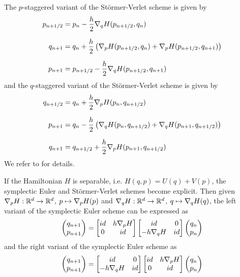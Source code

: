 \documentclass[twoside,a4paper]{article}
\begin{document}
The $p$-staggered variant of the Störmer-Verlet scheme is given by
\begin{align*}
	p_{n+1/2} &= p_n - \frac{h}{2} \grad[q]{H}(p_{n+1/2}, q_n) \\[7pt]
	q_{n+1} &= q_n + \frac{h}{2} \lb \grad[p]{H}(p_{n+1/2}, q_n) + \grad[p]{H}(p_{n+1/2}, q_{n+1}) \rb \\[7pt]
	p_{n+1} &= p_{n+1/2} - \frac{h}{2} \grad[q]{H}(p_{n+1/2}, q_{n+1})
\end{align*}
and the $q$-staggered variant of the Störmer-Verlet scheme is given by
\begin{align*}
	q_{n+1/2} &= q_n + \frac{h}{2} \grad[p]{H}(p_n, q_{n+1/2}) \\[7pt]
	p_{n+1} &= q_n - \frac{h}{2} \lb \grad[q]{H}(p_n, q_{n+1/2}) + \grad[q]{H}(p_{n+1}, q_{n+1/2}) \rb \\[7pt]
	q_{n+1} &= q_{n+1/2} + \frac{h}{2} \grad[p]{H}(p_{n+1}, q_{n+1/2})
\end{align*}
We refer to \citet[p.~189 and p.~190]{hairer2006} for details.

If the Hamiltonian $H$ is separable, i.e. $H(q,p) = U(q) + V(p)$, the symplectic Euler and Störmer-Verlet
schemes become explicit. Then given $\grad[p]{H} : \mathbb{R}^d \to \mathbb{R}^d$, $p \mapsto \grad[p]{H}(p)$ 
and $\grad[q]{H} : \mathbb{R}^d \to \mathbb{R}^d$, $q \mapsto \grad[q]{H}(q)$,
the left variant of the symplectic Euler scheme can be expressed as
\begin{equation*}
	\begin{pmatrix}
		q_{n+1} \\
		p_{n+1}
	\end{pmatrix} =
	\begin{bmatrix}
		id & h \grad[p]{H} \\
		0 & id
	\end{bmatrix} \begin{bmatrix}
		id & 0 \\
		-h \grad[q]{H} & id
	\end{bmatrix}
	\begin{pmatrix}
		q_{n} \\
		p_{n}
	\end{pmatrix} 
\end{equation*}
and the right variant of the symplectic Euler scheme as
\begin{equation*}
	\begin{pmatrix}
		q_{n+1} \\
		p_{n+1}
	\end{pmatrix} =
	\begin{bmatrix}
		id & 0 \\
		-h \grad[q]{H} & id
	\end{bmatrix}
	\begin{bmatrix}
		id & h \grad[p]{H} \\
		0 & id
	\end{bmatrix}
	\begin{pmatrix}
		q_{n} \\
		p_{n}
	\end{pmatrix}
\end{equation*}
\end{document}
